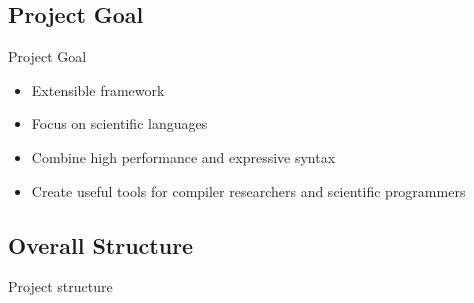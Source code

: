 \subsection{Project Goal}
\begin{frame}{Project Goal}
  \begin{itemize}
  \item Extensible framework
  \item Focus on scientific languages
  \item Combine high performance and expressive syntax
  \item Create useful tools for compiler researchers and scientific
    programmers
  \end{itemize}
\end{frame}

\subsection{Overall Structure}
\begin{frame}{Project structure}
\end{frame}
